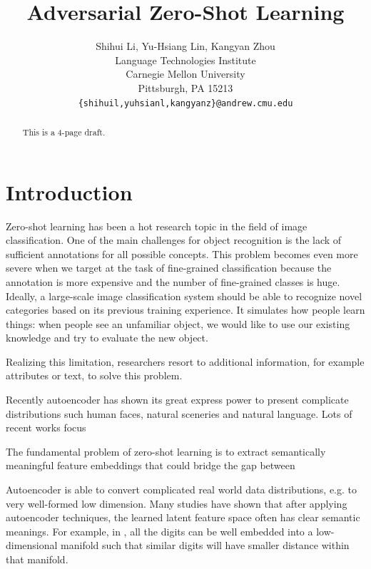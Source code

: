 \documentclass{article}
\title{Adversarial Zero-Shot Learning}
\author{
	Shihui Li, Yu-Hsiang Lin, Kangyan Zhou
		\\
	Language Technologies Institute\\
	Carnegie Mellon University\\
	Pittsburgh, PA 15213 \\
	\texttt{\{shihuil,yuhsianl,kangyanz\}@andrew.cmu.edu} \\
}
\begin{document}

\maketitle

\begin{abstract}

	This is a 4-page draft.

\end{abstract}




\section{Introduction}

Zero-shot learning has been a hot research topic in the field of image classification. One of the main challenges for object recognition is the lack of sufficient annotations for all possible concepts. This problem becomes even more severe when we target at the task of fine-grained classification because the annotation is more expensive and the number of fine-grained classes is huge. Ideally, a large-scale image classification system should be able to recognize novel categories based on its previous training experience. It simulates how people learn things: when people see an unfamiliar object, we would like to use our existing knowledge and try to evaluate the new object. 

Realizing this limitation, researchers resort to additional information, for example attributes or text, to solve this problem. \par 

Recently autoencoder has shown its great express power to present complicate distributions such human faces, natural sceneries and natural language. Lots of recent works focus 

The fundamental problem of zero-shot learning is to extract semantically meaningful feature embeddings that could bridge the gap between 

Autoencoder is able to convert complicated real world data distributions, e.g. to very well-formed low dimension. Many studies have shown that after applying autoencoder techniques, the learned latent feature space often has clear semantic meanings. For example, in \cite{makhzani2015adversarial}, all the digits can be well embedded into a low-dimensional manifold such that similar digits will have smaller distance within that manifold.  
\end{document}
